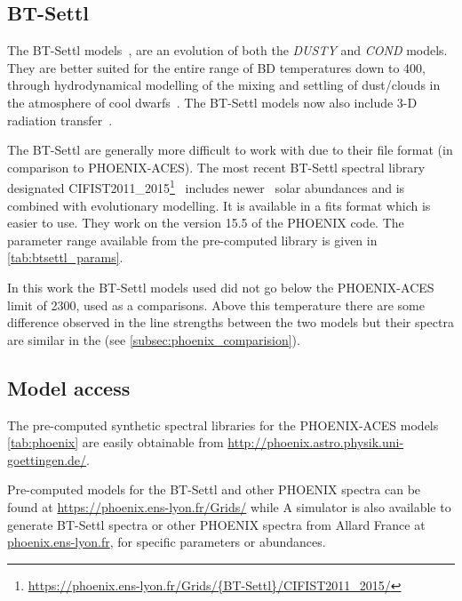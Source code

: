\subsection{BT-Settl}
\label{subsec:btsettl}
The {BT-Settl} models~\citep{allard_models_2012,allard_atmospheres_2012,rajpurohit_effective_2013,baraffe_new_2015}, are an evolution of both the \emph{DUSTY} and \emph{COND} models.
They are better suited for the entire range of {BD} temperatures down to 400\K{}, through hydrodynamical modelling of the mixing and settling of dust/clouds in the atmosphere of cool dwarfs~\citep{freytag_role_2010}.
The {BT-Settl} models now also include 3-D radiation transfer~\citep{seelmann_3d_2010}.


The {BT-Settl} are generally more difficult to work with due to their file format (in comparison to {PHOENIX-ACES}).
The most recent {BT-Settl} spectral library designated {CIFIST2011\_2015}\footnote{\url{https://phoenix.ens-lyon.fr/Grids/{BT-Settl}/CIFIST2011_2015/}}~\citep{baraffe_new_2015} includes newer~\citet{caffau_solar_2011} solar abundances and is combined with evolutionary modelling.
It is available in a fits format which is easier to use.
They work on the version 15.5 of the {PHOENIX} code.
The parameter range available from the pre-computed library is given in \cref{tab:btsettl_params}.



In this work the {BT-Settl} models used did not go below the {PHOENIX-ACES} limit of 2300\K{}, used as a comparisons.
Above this temperature there are some difference observed in the line strengths between the two models but their spectra are similar in the \nir{} (see \cref{subsec:phoenix_comparision}).


\subsection{Model access}
\label{subsec:model_access}
The pre-computed synthetic spectral libraries for the {PHOENIX-ACES} models \cref{tab:phoenix} are easily obtainable from \href{http://phoenix.astro.physik.uni-goettingen.de/}{http://phoenix.astro.physik.uni-goettingen.de/}.

Pre-computed models for the {BT-Settl} and other {PHOENIX} spectra can be found  at \href{https://phoenix.ens-lyon.fr/Grids/}{https://phoenix.ens-lyon.fr/Grids/} while
A simulator is also available to generate {BT-Settl} spectra or other {PHOENIX} spectra from {Allard France} at \href{phoenix.ens-lyon.fr}{phoenix.ens-lyon.fr}, for specific parameters or abundances.

